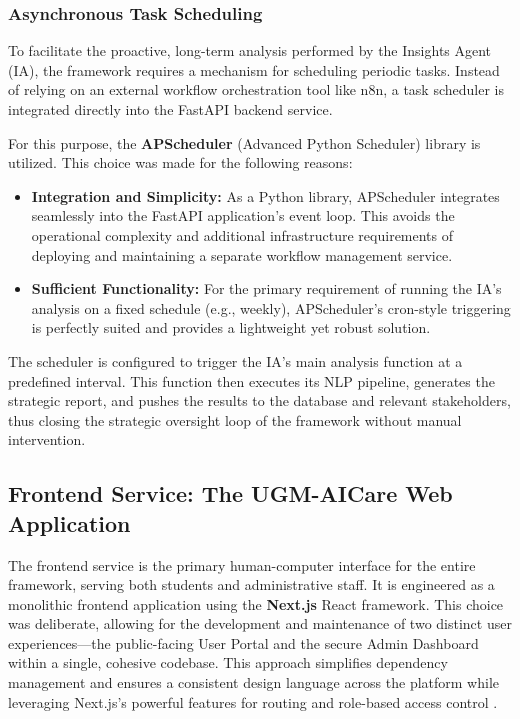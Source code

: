 \subsubsection{Asynchronous Task Scheduling}

To facilitate the proactive, long-term analysis performed by the Insights Agent (IA), the framework requires a mechanism for scheduling periodic tasks. Instead of relying on an external workflow orchestration tool like n8n, a task scheduler is integrated directly into the FastAPI backend service.

For this purpose, the \textbf{APScheduler} (Advanced Python Scheduler) library is utilized. This choice was made for the following reasons:
\begin{itemize}
    \item \textbf{Integration and Simplicity:} As a Python library, APScheduler integrates seamlessly into the FastAPI application's event loop. This avoids the operational complexity and additional infrastructure requirements of deploying and maintaining a separate workflow management service.
    \item \textbf{Sufficient Functionality:} For the primary requirement of running the IA's analysis on a fixed schedule (e.g., weekly), APScheduler's cron-style triggering is perfectly suited and provides a lightweight yet robust solution.
\end{itemize}
The scheduler is configured to trigger the IA's main analysis function at a predefined interval. This function then executes its NLP pipeline, generates the strategic report, and pushes the results to the database and relevant stakeholders, thus closing the strategic oversight loop of the framework without manual intervention.

\subsection{Frontend Service: The UGM-AICare Web Application}

The frontend service is the primary human-computer interface for the entire framework, serving both students and administrative staff. It is engineered as a monolithic frontend application using the \textbf{Next.js} React framework. This choice was deliberate, allowing for the development and maintenance of two distinct user experiences—the public-facing User Portal and the secure Admin Dashboard within a single, cohesive codebase. This approach simplifies dependency management and ensures a consistent design language across the platform while leveraging Next.js's powerful features for routing and role-based access control \cite{vercel2024nextjsdocs, granicz2022modernreact}.

